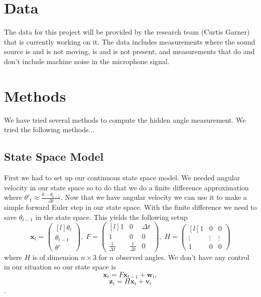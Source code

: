 \documentclass[11pt]{amsart}
\begin{document}
\section{Data}
The data for this project will be provided by the research team (Curtis Garner) that is currently working on it. The data includes measurements where the sound 
source is and is not moving, is and is not present, and measurements that do and don’t include machine noise in the microphone signal.




\section{Methods}
We have tried several methods to compute the hidden angle measurement. We tried the following methods...

\subsection{State Space Model}
First we had to set up our continuous state space model. We needed angular velocity in our state space so to do that we do a finite difference approximation 
where $\theta'_t \approx \frac{\theta - \theta_{t-1}}{\Delta t}$. Now that we have angular velocity we can use it to make a simple forward Euler step in our state 
space. With the finite difference we need to save $\theta_{t-1}$ in the state space. This yields the following setup
\[\mathbf{x}_t = \begin{pmatrix*}[l]
    \theta_t \\
    \theta_{t-1} \\
    \theta'
\end{pmatrix*},\;  
F = \begin{pmatrix*}[l]
    1 & 0 & \Delta t \\
    1 & 0 & 0 \\
    \frac{1}{\Delta t} & \frac{1}{\Delta t} & 0
\end{pmatrix*},\;
H = \begin{pmatrix*}[l]
    1 & 0 & 0 \\
    \vdots & \vdots & \vdots\\
    1 & 0 & 0

\end{pmatrix*}\]
 where $H$ is of dimension $n\times3$ for $n$ observed angles. We don't have any control in our situation so our state space is
 \[\mathbf{x}_t = F\mathbf{x}_{t-1} + \mathbf{w}_t,\]
\[\mathbf{z}_t = H\mathbf{x}_t + \mathbf{v}_t\].
\end{document}
